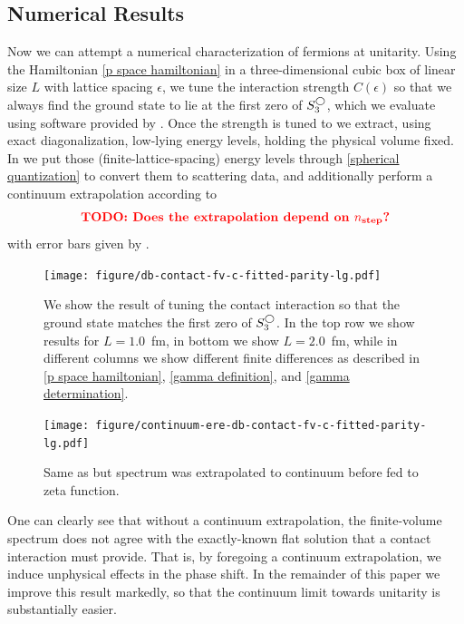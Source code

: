 \subsection{Numerical Results}

Now we can attempt a numerical characterization of fermions at unitarity.
Using the Hamiltonian \eqref{p space hamiltonian} in a three-dimensional cubic box of linear size $L$ with lattice spacing $\epsilon$, we tune the interaction strength $C(\epsilon)$ so that we always find the ground state to lie at the first zero of $S^{\bigcirc}_3$, which we evaluate using software provided by .
Once the strength is tuned to  we extract, using exact diagonalization, low-lying energy levels, holding the physical volume fixed.
In  we put those (finite-lattice-spacing) energy levels through \eqref{spherical quantization} to convert them to scattering data, and additionally perform a continuum extrapolation according to
\begin{equation}
    \text{{\bf\color{red}TODO: Does the extrapolation depend on \ensuremath{{n_\text{step}}}?}}
\end{equation}
with error bars given by .  

\begin{figure}[th]
    \texttt{[image: figure/db-contact-fv-c-fitted-parity-lg.pdf]}
    \caption{We show the result of tuning the contact interaction so that the ground state matches the first zero of $S^{\bigcirc}_3$.  In the top row we show results for $L=1.0$~fm, in bottom we show $L=2.0$~fm, while in different columns we show different finite differences as described in \eqref{p space hamiltonian}, \eqref{gamma definition}, and \eqref{gamma determination}. }
    \label{fig:unimproved spherical}
\end{figure}

\begin{figure}[th]
    \texttt{[image: figure/continuum-ere-db-contact-fv-c-fitted-parity-lg.pdf]}
    \caption{Same as  but spectrum was extrapolated to continuum before fed to zeta function.}
    \label{fig:unimproved spherical continuum extrapolation}
\end{figure}

One can clearly see that without a continuum extrapolation, the finite-volume spectrum does not agree with the exactly-known flat solution that a contact interaction must provide.
That is, by foregoing a continuum extrapolation, we induce unphysical effects in the phase shift.
In the remainder of this paper we improve this result markedly, so that the continuum limit towards unitarity is substantially easier.

